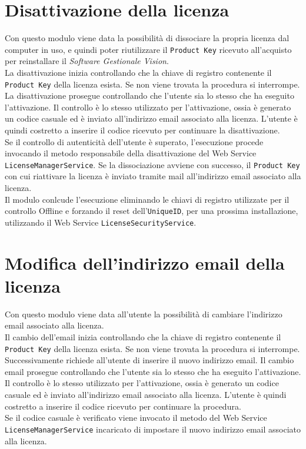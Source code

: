 \section{Disattivazione della licenza}

Con questo modulo viene data la possibilità di dissociare la propria licenza dal computer in uso, e quindi poter riutilizzare il \texttt{Product Key} ricevuto all’acquisto per reinstallare il \textit{Software Gestionale Vision}.\\
La disattivazione inizia controllando che la chiave di registro contenente il \texttt{Product Key} della licenza esista. Se non viene trovata la procedura si interrompe.\\
La disattivazione prosegue controllando che l'utente sia lo stesso che ha eseguito l'attivazione. Il controllo è lo stesso utilizzato per l'attivazione, ossia è generato un codice casuale ed è inviato all'indirizzo email associato alla licenza. L'utente è quindi costretto a inserire il codice ricevuto per continuare la disattivazione.
\\Se il controllo di autenticità dell'utente è superato, l’esecuzione procede invocando il metodo responsabile della disattivazione del Web Service \texttt{LicenseManagerService}. Se la dissociazione  avviene con successo, il \texttt{Product Key} con cui riattivare la licenza è inviato tramite mail all’indirizzo email associato alla licenza.\\
Il modulo conlcude l'esecuzione eliminando le chiavi di registro utilizzate per il controllo Offline e forzando il reset dell’\texttt{UniqueID}, per una prossima installazione, utilizzando il Web Service \texttt{LicenseSecurityService}. 



\section{Modifica dell'indirizzo email della licenza}

Con questo modulo viene data all'utente la possibilità di cambiare l'indirizzo email associato alla licenza.\\
Il cambio dell’email inizia controllando che la chiave di registro contenente il \texttt{Product Key} della licenza esista. Se non viene trovata la procedura si interrompe. Successivamente richiede all'utente di inserire il nuovo indirizzo email. Il cambio email prosegue controllando che l'utente sia lo stesso che ha eseguito l'attivazione. Il controllo è lo stesso utilizzato per l'attivazione, ossia è generato un codice casuale ed è inviato all'indirizzo email associato alla licenza. L'utente è quindi costretto a inserire il codice ricevuto per continuare la procedura.\\
Se il codice casuale è verificato viene invocato il metodo del Web Service\\ \texttt{LicenseManagerService} incaricato di impostare il nuovo indirizzo email associato alla licenza.

